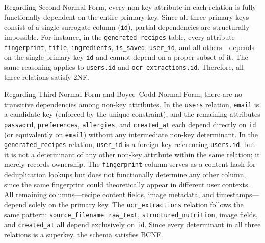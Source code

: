 Regarding Second Normal Form, every non-key attribute in each
relation is fully functionally dependent on the entire primary key.
Since all three primary keys consist of a single surrogate column
(\texttt{id}), partial dependencies are structurally impossible.
For instance, in the \texttt{generated\_recipes} table, every
attribute---\texttt{fingerprint}, \texttt{title},
\texttt{ingredients}, \texttt{is\_saved}, \texttt{user\_id}, and
all others---depends on the single primary key \texttt{id} and
cannot depend on a proper subset of it. The same reasoning applies
to \texttt{users.id} and \texttt{ocr\_extractions.id}. Therefore,
all three relations satisfy 2NF.

Regarding Third Normal Form and Boyce--Codd Normal Form, there are
no transitive dependencies among non-key attributes. In the
\texttt{users} relation, \texttt{email} is a candidate key (enforced
by the unique constraint), and the remaining attributes
\texttt{password}, \texttt{preferences}, \texttt{allergies}, and
\texttt{created\_at} each depend directly on \texttt{id} (or
equivalently on \texttt{email}) without any intermediate non-key
determinant. In the \texttt{generated\_recipes} relation,
\texttt{user\_id} is a foreign key referencing \texttt{users.id},
but it is not a determinant of any other non-key attribute within
the same relation; it merely records ownership. The
\texttt{fingerprint} column serves as a content hash for
deduplication lookups but does not functionally determine any other
column, since the same fingerprint could theoretically appear in
different user contexts. All remaining columns---recipe content
fields, image metadata, and timestamps---depend solely on the
primary key. The \texttt{ocr\_extractions} relation follows the same
pattern: \texttt{source\_filename}, \texttt{raw\_text},
\texttt{structured\_nutrition}, image fields, and
\texttt{created\_at} all depend exclusively on \texttt{id}. Since
every determinant in all three relations is a superkey, the schema
satisfies BCNF.


